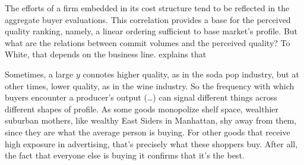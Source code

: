 \documentclass[a4paper, 12pt, openright, oneside, german, french, brazil, english]{abntex2}
\begin{document}
	
	The efforts of a firm embedded in its cost structure tend to be reflected in the aggregate buyer evaluations. This correlation provides a base for the perceived quality ranking, namely, a linear ordering sufficient to base market's profile. But what are the relations between commit volumes and the perceived quality? To White, that depends on the business line.  explains that
	
	
	\begin{citacao}
		Sometimes, a large $y$ connotes higher quality, as in the soda pop industry, but at other times, lower quality, as in the wine industry. So the frequency with which buyers encounter a producer's output (\dots) can signal different things across different shapes of profile. As some goods monopolize shelf space, wealthier suburban mothers, like wealthy East Siders in Manhattan, shy away from them, since they are what the average person is buying. For other goods that receive high exposure in advertising, that's precisely what these shoppers buy. After all, the fact that everyone else is buying it confirms that it's the best. \cite[p. 15]{white2002markets}
	\end{citacao}
	
	
\end{document}
